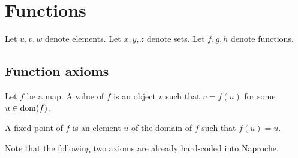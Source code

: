 \documentclass[../../set-theory.ftl.tex]{subfiles}
\begin{document}
  \section{Functions}

  \begin{forthel}
  \end{forthel}

  \begin{forthel}
  Let $u,v,w$ denote elements.
  Let $x,y,z$ denote sets.
  Let $f,g,h$ denote functions.
  \end{forthel}


  \subsection{Function axioms}

  \begin{forthel}
    \begin{definition}
      Let $f$ be a map.
      A value of $f$ is an object $v$ such that $v = f(u)$ for some $u \in \operatorname{dom}(f)$.
    \end{definition}

    \begin{definition}
      A fixed point of $f$ is an element $u$ of the domain of $f$ such that $f(u) = u$.
    \end{definition}
  \end{forthel}

  Note that the following two axioms are already hard-coded into Naproche.
\end{document}
